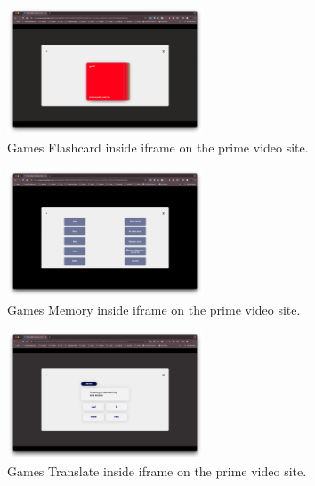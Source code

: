\documentclass[12pt]{article}
\begin{document}
    \begin{figure}[!h]
      \centering
      \caption{
      Games Flashcard inside iframe on the prime video site.
      }
      \label{fig:iframe2}
      \includegraphics[width=0.52\textwidth]{assets/10.png}
    \end{figure}

    \begin{figure}[!h]
      \centering
      \caption{
      Games Memory inside iframe on the prime video site.
      }
      \label{fig:iframe3}
      \includegraphics[width=0.52\textwidth]{assets/11.png}
    \end{figure}

    \begin{figure}[!h]
      \centering
      \caption{
      Games Translate inside iframe on the prime video site.
      }
      \label{fig:iframe4}
      \includegraphics[width=0.52\textwidth]{assets/12.png}
    \end{figure}
\end{document}

